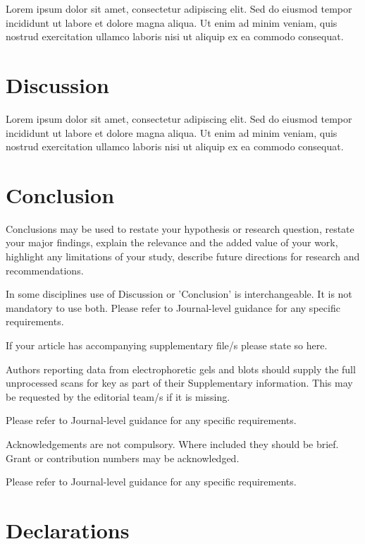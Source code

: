 \documentclass[pdflatex,sn-basic]{sn-jnl}           %
\theoremstyle{thmstyleone}%
\theoremstyle{thmstyletwo}%
\theoremstyle{thmstylethree}%
\begin{document}
Lorem ipsum dolor sit amet, consectetur adipiscing elit. Sed do eiusmod tempor incididunt ut labore et dolore magna aliqua. Ut enim ad minim veniam, quis nostrud exercitation ullamco laboris nisi ut aliquip ex ea commodo consequat.

\section{Discussion}\label{sec6}

Lorem ipsum dolor sit amet, consectetur adipiscing elit. Sed do eiusmod tempor incididunt ut labore et dolore magna aliqua. Ut enim ad minim veniam, quis nostrud exercitation ullamco laboris nisi ut aliquip ex ea commodo consequat.

\section{Conclusion}\label{sec13}

Conclusions may be used to restate your hypothesis or research question, restate your major findings, explain the relevance and the added value of your work, highlight any limitations of your study, describe future directions for research and recommendations. 

In some disciplines use of Discussion or 'Conclusion' is interchangeable. It is not mandatory to use both. Please refer to Journal-level guidance for any specific requirements. 

\backmatter


If your article has accompanying supplementary file/s please state so here. 

Authors reporting data from electrophoretic gels and blots should supply the full unprocessed scans for key as part of their Supplementary information. This may be requested by the editorial team/s if it is missing.

Please refer to Journal-level guidance for any specific requirements.


Acknowledgements are not compulsory. Where included they should be brief. Grant or contribution numbers may be acknowledged.

Please refer to Journal-level guidance for any specific requirements.

\section*{Declarations}
\end{document}
